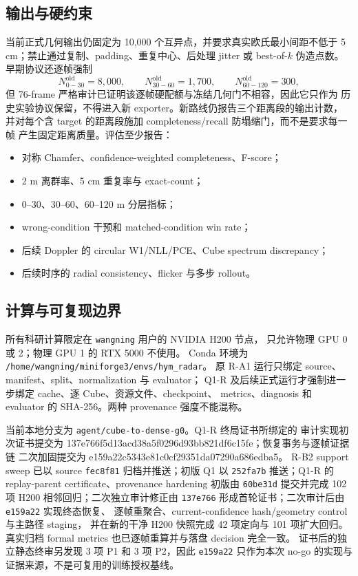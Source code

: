 \documentclass[11pt,a4paper,fontset=none]{ctexart}
\newcommand{\code}[1]{\texttt{#1}}
\newcommand{\hash}[2]{{\small\ttfamily #1\allowbreak{}#2}}
\begin{document}
\subsection{输出与硬约束}

当前正式几何输出仍固定为 10,000 个互异点，并要求真实欧氏最小间距不低于
5 cm；禁止通过复制、padding、重复中心、后处理 jitter 或 best-of-$k$ 伪造点数。
早期协议还逐帧强制
\begin{equation}
  N^{\mathrm{old}}_{0-30}=8{,}000,\qquad
  N^{\mathrm{old}}_{30-60}=1{,}700,\qquad
  N^{\mathrm{old}}_{60-120}=300,
\end{equation}
但 76-frame 严格审计已证明该逐帧硬配额与冻结几何门不相容，因此它只作为
历史实验协议保留，不得进入新 exporter。新路线仍报告三个距离段的输出计数，
并对每个含 target 的距离段施加 completeness/recall 防塌缩门，而不是要求每一帧
产生固定距离质量。评估至少报告：
\begin{itemize}
  \item 对称 Chamfer、confidence-weighted completeness、F-score；
  \item 2 m 离群率、5 cm 重复率与 exact-count；
  \item 0--30、30--60、60--120 m 分层指标；
  \item wrong-condition 干预和 matched-condition win rate；
  \item 后续 Doppler 的 circular W1/NLL/PCE、Cube spectrum discrepancy；
  \item 后续时序的 radial consistency、flicker 与多步 rollout。
\end{itemize}

\subsection{计算与可复现边界}

所有科研计算限定在 \code{wangning} 用户的 NVIDIA H200 节点，
只允许物理 GPU 0 或 2；物理 GPU 1 的 RTX 5000 不使用。
Conda 环境为
\code{/home/wangning/miniforge3/envs/hym\_radar}。
原 R-A1 运行只绑定 source、manifest、split、normalization 与 evaluator；
Q1-R 及后续正式运行才强制进一步绑定 cache、逐 Cube、资源文件、checkpoint、
metrics、diagnosis 和 evaluator 的 SHA-256。两种 provenance 强度不能混称。

当前本地分支为 \code{agent/cube-to-dense-g0}。Q1-R 终局证书所绑定的
审计实现初次证书提交为
\hash{137e766f5d13acd38a5f0296d93bb821}{df6c15fe}；恢复事务与逐帧证据链
二次加固提交为
\hash{e159a22c5343e81c0cf29351da07290a}{686edba5}。
R-B2 support sweep 已以 source \code{fec8f81} 归档并推送；初版 Q1 以
\code{252fa7b} 推送；Q1-R 的 replay-parent certificate、provenance hardening
初版由 \code{60be31d} 提交并完成 102 项 H200 相邻回归；二次独立审计修正由
\code{137e766} 形成首轮证书；二次审计后由 \code{e159a22} 实现终态恢复、
逐帧重聚合、current-confidence hash/geometry control 与主路径 staging，
并在新的干净 H200 快照完成 42 项定向与 101 项扩大回归。
真实归档 formal metrics 也已逐帧重算并与落盘 decision 完全一致。
证书后的独立静态终审另发现 3 项 P1 和 3 项 P2，因此
\code{e159a22} 只作为本次 no-go 的实现与证据来源，不是可复用的训练授权基线。
\end{document}
